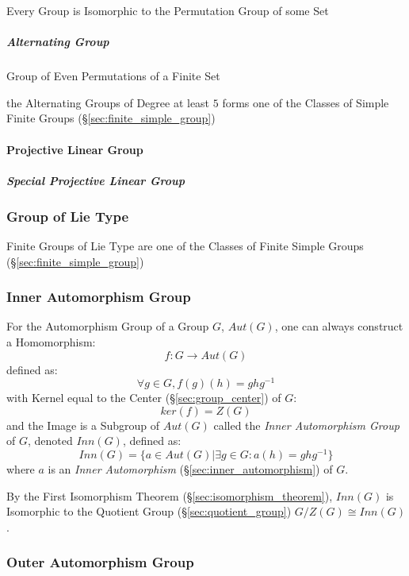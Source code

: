 Every Group is Isomorphic to the Permutation Group of some Set



\subparagraph{Alternating Group}\label{sec:alternating_group}\hfill

Group of Even Permutations of a Finite Set

the Alternating Groups of Degree at least $5$ forms one of the Classes of Simple
Finite Groups (\S\ref{sec:finite_simple_group})



\paragraph{Projective Linear Group}\label{sec:projective_linear_group}\hfill

\subparagraph{Special Projective Linear Group}
\label{sec:special_projective_linear_group}\hfill




\subsubsection{Group of Lie Type}\label{sec:lie_type_group}

Finite Groups of Lie Type are one of the Classes of Finite Simple Groups
(\S\ref{sec:finite_simple_group})



\subsubsection{Inner Automorphism Group}\label{sec:inner_automorphism_group}

For the Automorphism Group of a Group $G$, $Aut(G)$, one can always
construct a Homomorphism:
\[
    f : G \rightarrow Aut(G)
\]
defined as:
\[
    \forall g \in G, f (g) (h) = g h g^{-1}
\]
with Kernel equal to the Center (\S\ref{sec:group_center}) of $G$:
\[
    ker(f) = Z(G)
\]
and the Image is a Subgroup of $Aut(G)$ called the \emph{Inner
  Automorphism Group} of $G$, denoted $Inn(G)$, defined as:
\[
    Inn(G) = \{ a \in Aut(G) | \exists g \in G : a(h) = g h g^{-1} \}
\]
where $a$ is an \emph{Inner Automorphism}
(\S\ref{sec:inner_automorphism}) of $G$.

By the First Isomorphism Theorem (\S\ref{sec:isomorphism_theorem}),
$Inn(G)$ is Isomorphic to the Quotient Group
(\S\ref{sec:quotient_group}) $G / Z(G) \cong Inn(G)$.



\subsubsection{Outer Automorphism Group}\label{sec:outer_automorphism_group}

